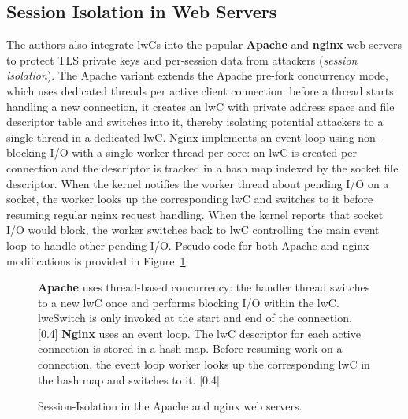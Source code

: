 \documentclass[10pt,twocolumn,a4paper]{article}
\begin{document}
\subsection{Session Isolation in Web Servers}\label{eval:web}
The authors also integrate lwCs into the popular \textbf{Apache} and \textbf{nginx} web servers to protect TLS private keys and per-session data from attackers (\textit{session isolation}).
The Apache variant extends the Apache pre-fork concurrency mode, which uses dedicated threads per active client connection:
before a thread starts handling a new connection, it creates an lwC with private address space and file descriptor table and switches into it, thereby isolating potential attackers to a single thread in a dedicated lwC.
Nginx implements an event-loop using non-blocking I/O with a single worker thread per core:
an lwC is created per connection and the descriptor is tracked in a hash map indexed by the socket file descriptor.
When the kernel notifies the worker thread about pending I/O on a socket, the worker looks up the corresponding lwC and switches to it before resuming regular nginx request handling.
When the kernel reports that socket I/O would block, the worker switches back to lwC controlling the main event loop to handle other pending I/O.
Pseudo code for both Apache and nginx modifications is provided in Figure~\ref{eval:web:pseudocode}.
\cite{lwcpaper}

\begin{figure}
  \centering
  \subcaptionbox
  {\textbf{Apache} uses thread-based concurrency: the handler thread switches to a new lwC once and performs blocking I/O within the lwC. lwcSwitch is only invoked at the start and end of the connection.}
  [0.4\linewidth]
  {
  }
  \hspace{1cm}
  \subcaptionbox
  {\textbf{Nginx} uses an event loop. The lwC descriptor for each active connection is stored in a hash map. Before resuming work on a connection, the event loop worker looks up the corresponding lwC in the hash map and switches to it.}
  [0.4\linewidth]
  {
  }
  \caption{Session-Isolation in the Apache and nginx web servers.\label{eval:web:pseudocode}}
\end{figure}
\end{document}

